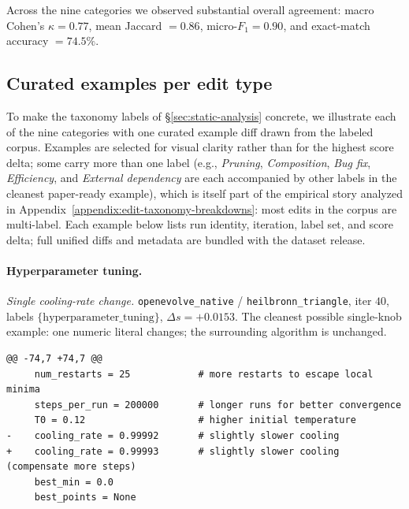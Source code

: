 Across the nine categories we observed substantial overall agreement: macro Cohen's $\kappa = 0.77$, mean Jaccard $= 0.86$, micro-$F_1 = 0.90$, and exact-match accuracy $= 74.5\%$.
\subsection{Curated examples per edit type}
\label{appendix:edit-examples}

To make the taxonomy labels of \S\ref{sec:static-analysis} concrete, we illustrate each of the nine categories with one curated example diff drawn from the labeled corpus. Examples are selected for visual clarity rather than for the highest score delta; some carry more than one label (e.g., \emph{Pruning}, \emph{Composition}, \emph{Bug fix}, \emph{Efficiency}, and \emph{External dependency} are each accompanied by other labels in the cleanest paper-ready example), which is itself part of the empirical story analyzed in Appendix~\ref{appendix:edit-taxonomy-breakdowns}: most edits in the corpus are multi-label. Each example below lists run identity, iteration, label set, and score delta; full unified diffs and metadata are bundled with the dataset release.

\paragraph{Hyperparameter tuning.}
\textit{Single cooling-rate change.} \texttt{openevolve\_native} / \texttt{heilbronn\_triangle}, iter $40$, labels $\{\text{hyperparameter\_tuning}\}$, $\Delta s = +0.0153$. The cleanest possible single-knob example: one numeric literal changes; the surrounding algorithm is unchanged.
{\scriptsize
\begin{verbatim}
@@ -74,7 +74,7 @@
     num_restarts = 25            # more restarts to escape local minima
     steps_per_run = 200000       # longer runs for better convergence
     T0 = 0.12                    # higher initial temperature
-    cooling_rate = 0.99992       # slightly slower cooling
+    cooling_rate = 0.99993       # slightly slower cooling (compensate more steps)
     best_min = 0.0
     best_points = None
\end{verbatim}
}

